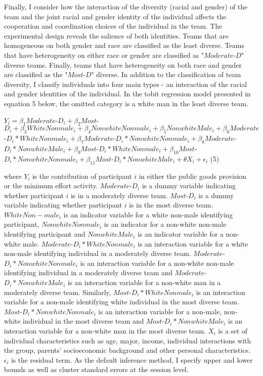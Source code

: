 \hspace  *{0mm} Finally, I consider how the interaction of the diversity (racial and gender) of the team and the joint racial and gender identity of the individual affects the cooperation and coordination choices of the individual in the team. The experimental design reveals the salience of both identities. Teams that are homogeneous on both gender and race are classified as the least diverse. Teams that have heterogeneity on either race or gender are classified as "$Moderate$-$D$" diverse teams. Finally, teams that have heterogeneity on both race and gender are classified as the "$Most$-$D$" diverse. In addition to the classification of team diversity, I classify individuals into four main types - an interaction of the racial and gender identities of the individual. In the tobit regression model presented in equation 5 below, the omitted category is a white man in the least diverse team.  

\begin{center}
 $Y_{i}=\beta_1Moderate$-$D_{i}+\beta_2Most$-$D_{i}+\beta_3WhiteNonmale_{i}+\beta_4NonwhiteNonmale_{i}+\beta_5 NonwhiteMale_{i}+\beta_6Moderate$-$D_{i}*WhiteNonmale_{i}+\beta_7Moderate$-$D_{i}*NonwhiteNonmale_{i}+ \beta_8Moderate$-$D_{i}*NonwhiteMale_{i}+\beta_9Most$-$D_{i}*WhiteNonmale_{i}+\beta_{10}Most$-$D_{i}*NonwhiteNonmale_{i}+\beta_{11}Most$-$D_{i}*NonwhiteMale_{i}+\theta X_{i}+\epsilon_{i}  $  \space \space \space    (5)
\end{center}

\noindent where $Y_{i}$ is the contribution of participant $i$ in either the public goods provision or the minimum effort activity. $Moderate$-$D_{i}$ is a dummy variable indicating whether participant $i$ is in a moderately diverse team. $Most$-$D_{i}$ is a dummy variable indicating whether participant $i$ is in the most diverse team. $WhiteNon-male_{i}$ is an indicator variable for a white non-male identifying participant,  $NonwhiteNonmale_{i}$ is an indicator for a non-white non-male identifying participant and $NonwhiteMale_{i}$ is an indicator variable for a non-white male. $Moderate$-$D_{i}*WhiteNonmale_{i}$ is an interaction variable for a white non-male identifying individual in a moderately diverse team. $Moderate$-$D_{i}*NonwhiteNonmale_{i}$ is an interaction variable for a non-white non-male identifying individual in a moderately diverse team and $Moderate$-$D_{i}*NonwhiteMale_{i}$ is an interaction variable for a non-white man in a moderately diverse team. Similarly, $Most$-$D_{i}*WhiteNonmale_{i}$ is an interaction variable for a non-male identifying white individual in the most diverse team.  $Most$-$D_{i}*NonwhiteNonmale_{i}$ is an interaction variable for a non-male, non-white individual in the most diverse team and $Most$-$D_{i}*NonwhiteMale_{i}$ is an interaction variable for a non-white man in the most diverse team. $X_{i}$ is a set of individual characteristics such as age, major, income, individual interactions with the group, parents' socioeconomic background and other personal characteristics. $\epsilon_{i}$ is the residual term. As the default inference method, I specify upper and lower bounds as well as cluster standard errors at the session level.


